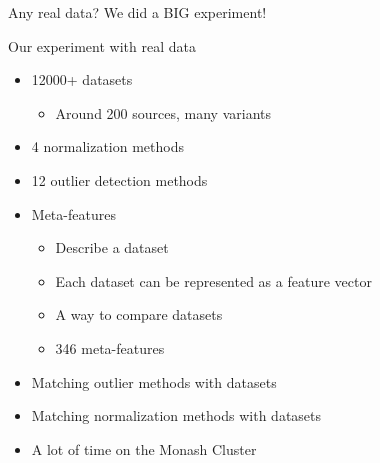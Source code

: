 \documentclass{beamer}
\begin{document}
\begin{darkframes}
    \begin{frame}{Any real data?}
        \centering
        {\huge We did a BIG experiment!}
    \end{frame}

  	\begin{frame}{Our experiment with real data}
 	\begin{itemize}
 		\item 12000+ datasets
 		\begin{itemize}
 			\item Around 200 sources, many variants
 		\end{itemize}
 		\item 4 normalization methods
 		\item 12 outlier detection methods
 		\item Meta-features
 		\begin{itemize}
 			\item Describe a dataset
 			\item Each dataset can be represented as a feature vector
 			\item A way to compare datasets
 			\item 346 meta-features
 		\end{itemize}
 		\item Matching outlier methods with datasets
 		\item Matching normalization methods with datasets
 		\vspace{0.75cm}
 		\item A lot of time on the Monash Cluster 
 	\end{itemize}

 	\end{frame}	


\end{darkframes}
\end{document}
